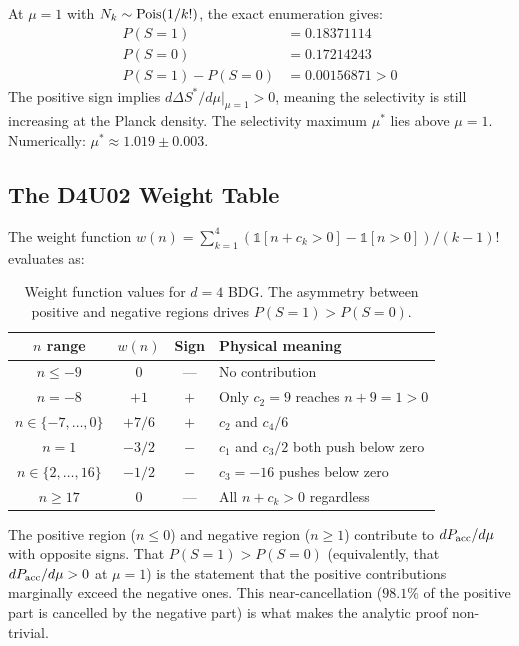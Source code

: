 \documentclass[12pt,a4paper]{article}
\begin{document}
At $\mu=1$ with $N_k\sim{\rm Pois}(1/k!)$, the exact enumeration gives:
\begin{align}
  P(S=1) &= 0.18371114 \\
  P(S=0) &= 0.17214243 \\
  P(S=1) - P(S=0) &= 0.00156871 > 0
\end{align}
The positive sign implies $d\Delta S^*/d\mu|_{\mu=1}>0$, meaning the selectivity is still increasing at the Planck density.  The selectivity maximum $\mu^*$ lies above $\mu=1$.  Numerically: $\mu^*\approx1.019\pm0.003$.

\subsection{The D4U02 Weight Table}

The weight function $w(n)=\sum_{k=1}^{4}(\mathbb{1}[n+c_k>0]-\mathbb{1}[n>0])/(k-1)!$ evaluates as:

\begin{table}[ht]
\centering
\caption{Weight function values for $d=4$ BDG.  The asymmetry between positive and negative regions drives $P(S=1)>P(S=0)$.}
\label{tab:weight}
\begin{tabular}{cccl}
\toprule
$n$ range & $w(n)$ & Sign & Physical meaning \\
\midrule
$n\leq-9$ & $0$ & --- & No contribution \\
$n=-8$ & $+1$ & $+$ & Only $c_2=9$ reaches $n+9=1>0$ \\
$n\in\{-7,\ldots,0\}$ & $+7/6$ & $+$ & $c_2$ and $c_4/6$ \\
$n=1$ & $-3/2$ & $-$ & $c_1$ and $c_3/2$ both push below zero \\
$n\in\{2,\ldots,16\}$ & $-1/2$ & $-$ & $c_3=-16$ pushes below zero \\
$n\geq17$ & $0$ & --- & All $n+c_k>0$ regardless \\
\bottomrule
\end{tabular}
\end{table}

The positive region ($n\leq0$) and negative region ($n\geq1$) contribute to $dP_{\rm acc}/d\mu$ with opposite signs.  That $P(S=1)>P(S=0)$ (equivalently, that $dP_{\rm acc}/d\mu>0$ at $\mu=1$) is the statement that the positive contributions marginally exceed the negative ones.  This near-cancellation ($98.1\%$ of the positive part is cancelled by the negative part) is what makes the analytic proof non-trivial.

\end{document}
